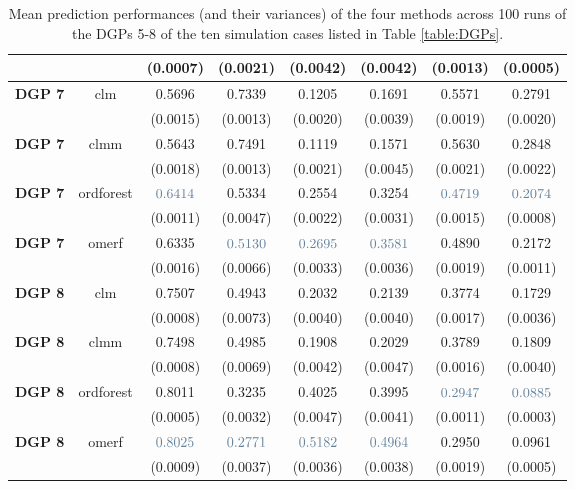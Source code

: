 \begin{table}[H]
\begin{tabular}{|p{4em} c c c c c c c |}
    \textbf{} &  & (0.0007) & (0.0021) & (0.0042)  & (0.0042)  & (0.0013)  & (0.0005) \T\B \\
    \hline
    \textbf{DGP 7} & clm & 0.5696 & 0.7339 & 0.1205 & 0.1691 & 0.5571 & 0.2791 \T\B \\
    \textbf{} &  & (0.0015) & (0.0013) & (0.0020)  & (0.0039)  & (0.0019)  & (0.0020) \T\B \\
    \textbf{DGP 7} & clmm & 0.5643 & 0.7491 & 0.1119 & 0.1571 & 0.5630 & 0.2848 \T\B \\
    \textbf{} &  & (0.0018) & (0.0013) & (0.0021)  & (0.0045)  & (0.0021)  & (0.0022) \T\B \\
    \textbf{DGP 7} & ordforest & $\textcolor{bluePoli}{0.6414}$ & 0.5334 & 0.2554 & 0.3254 & $\textcolor{bluePoli}{0.4719}$ & $\textcolor{bluePoli}{0.2074}$ \T\B \\
    \textbf{} &  & (0.0011) & (0.0047) & (0.0022)  & (0.0031)  & (0.0015)  & (0.0008) \T\B \\
    \textbf{DGP 7} & omerf & 0.6335 & $\textcolor{bluePoli}{0.5130}$ & $\textcolor{bluePoli}{0.2695}$ & $\textcolor{bluePoli}{0.3581}$ & 0.4890 & 0.2172 \T\B \\
    \textbf{} &  & (0.0016) & (0.0066) & (0.0033)  & (0.0036)  & (0.0019)  & (0.0011) \T\B \\
    \hline
    \textbf{DGP 8} & clm & 0.7507 & 0.4943 & 0.2032 & 0.2139 & 0.3774 & 0.1729 \T\B \\
    \textbf{} &  & (0.0008) & (0.0073) & (0.0040)  & (0.0040)  & (0.0017)  & (0.0036) \T\B \\
    \textbf{DGP 8} & clmm & 0.7498 & 0.4985 & 0.1908 & 0.2029 & 0.3789 & 0.1809 \T\B \\
    \textbf{} &  & (0.0008) & (0.0069) & (0.0042)  & (0.0047)  & (0.0016)  & (0.0040) \T\B \\
    \textbf{DGP 8} & ordforest & 0.8011 & 0.3235  & 0.4025 & 0.3995 & $\textcolor{bluePoli}{0.2947}$ & $\textcolor{bluePoli}{0.0885}$ \T\B \\
    \textbf{} &  & (0.0005) & (0.0032) & (0.0047)  & (0.0041)  & (0.0011)  & (0.0003) \T\B \\
    \textbf{DGP 8} & omerf & $\textcolor{bluePoli}{0.8025}$ & $\textcolor{bluePoli}{0.2771}$ &  $\textcolor{bluePoli}{0.5182}$ & $\textcolor{bluePoli}{0.4964}$ & 0.2950 & 0.0961 \T\B \\
    \textbf{} &  & (0.0009) & (0.0037) & (0.0036)  & (0.0038)  & (0.0019)  & (0.0005) \B \\
    \hline
    \end{tabular}
    \\[10pt]
    \caption{Mean prediction performances (and their variances) of the four methods across 100 runs of the DGPs 5-8 of the ten simulation cases listed in Table \ref{table:DGPs}.}
    \label{table:res_slope}
\end{table}


